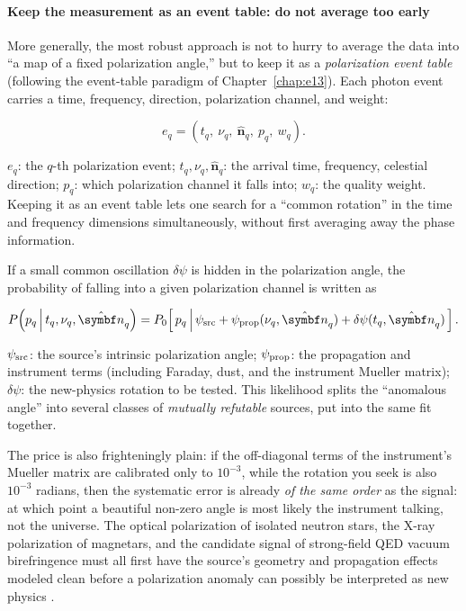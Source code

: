 \paragraph{Keep the measurement as an event table: do not average too early}

More generally, the most robust approach is not to hurry to average the data into ``a map of a fixed polarization angle,'' but to keep it as a \emph{polarization event table} (following the event-table paradigm of Chapter~\ref{chap:e13}). Each photon event carries a time, frequency, direction, polarization channel, and weight:

\begin{equation}
  e_q=(t_q,\ \nu_q,\ \hat{\bm n}_q,\ p_q,\ w_q).
  \label{eq:e22-event}
\end{equation}
\begin{formulaexplain}
\(e_q\): the \(q\)-th polarization event; \(t_q,\nu_q,\hat{\bm n}_q\): the arrival time, frequency, celestial direction; \(p_q\): which polarization channel it falls into; \(w_q\): the quality weight. Keeping it as an event table lets one search for a ``common rotation'' in the time and frequency dimensions simultaneously, without first averaging away the phase information.
\end{formulaexplain}

If a small common oscillation \(\delta\psi\) is hidden in the polarization angle, the probability of falling into a given polarization channel is written as

\begin{equation}
  P\!\left(p_q\,\middle|\,t_q,\nu_q,\hat{\bm n}_q\right)
  = P_0\!\left[\,p_q\,\middle|\,\psi_{\rm src}
     +\psi_{\rm prop}(\nu_q,\hat{\bm n}_q)+\delta\psi(t_q,\hat{\bm n}_q)\,\right].
  \label{eq:e22-likelihood}
\end{equation}
\begin{formulaexplain}
\(\psi_{\rm src}\): the source's intrinsic polarization angle; \(\psi_{\rm prop}\): the propagation and instrument terms (including Faraday, dust, and the instrument Mueller matrix); \(\delta\psi\): the new-physics rotation to be tested. This likelihood splits the ``anomalous angle'' into several classes of \emph{mutually refutable} sources, put into the same fit together.
\end{formulaexplain}

The price is also frighteningly plain: if the off-diagonal terms of the instrument's Mueller matrix are calibrated only to \(10^{-3}\), while the rotation you seek is also \(10^{-3}\) radians, then the systematic error is already \emph{of the same order} as the signal: at which point a beautiful non-zero angle is most likely the instrument talking, not the universe. The optical polarization of isolated neutron stars, the X-ray polarization of magnetars, and the candidate signal of strong-field QED vacuum birefringence must all first have the source's geometry and propagation effects modeled clean before a polarization anomaly can possibly be interpreted as new physics \citep{2017MNRAS.465..492M}.


